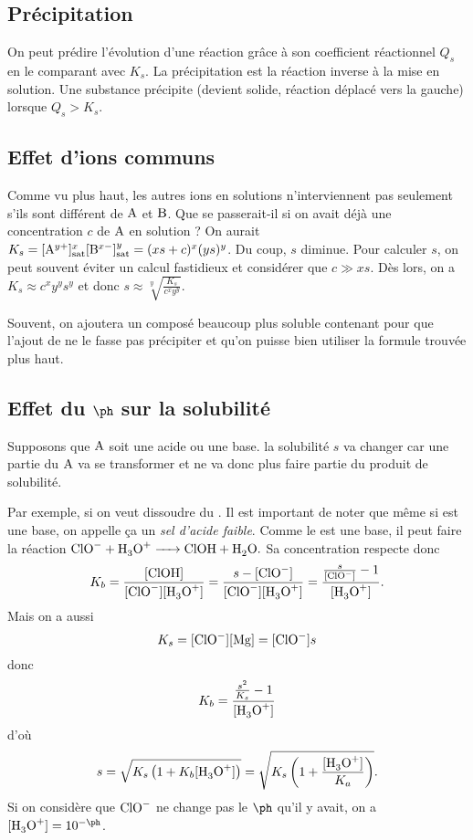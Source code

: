 \subsection{Précipitation}
On peut prédire l'évolution d'une réaction grâce à son coefficient réactionnel
$Q_s$ en le comparant avec $K_s$.
La précipitation est la réaction inverse à la mise en solution.
Une substance précipite (devient solide, réaction déplacé vers la gauche)
lorsque $Q_s > K_s$.

\subsection{Effet d'ions communs}
Comme vu plus haut, les autres ions en solutions n'interviennent pas
seulement s'ils sont différent de $\ce{A}$ et $\ce{B}$.
Que se passerait-il si on avait déjà
une concentration $c$ de $\ce{A}$ en solution ?
On aurait $K_s = [\ce{A}^{y+}]^x_\mathrm{sat}
[\ce{B}^{x-}]^y_\mathrm{sat} = (xs+c)^x(ys)^y$.
Du coup, $s$ diminue.
Pour calculer $s$, on peut souvent éviter un calcul fastidieux
et considérer que $c \gg xs$.
Dès lors, on a
$K_s \approx c^xy^ys^y$ et donc
$s \approx \sqrt[y]{\frac{K_s}{c^xy^y}}$.

Souvent, on ajoutera un composé beaucoup plus soluble contenant
 pour que l'ajout de  ne le fasse pas précipiter
et qu'on puisse bien utiliser la formule trouvée plus haut.

\subsection{Effet du $\ph$ sur la solubilité}
Supposons que $\ce{A}$ soit une acide ou une base.
la solubilité $s$ va changer car une partie du $\ce{A}$ va se transformer
et ne va donc plus faire partie du produit de solubilité.

Par exemple, si on veut dissoudre du .
Il est important de noter que même si  est une base,
on appelle ça un \emph{sel d'acide faible}.
Comme le  est une base,
il peut faire la réaction
\( \ce{ClO- + H3O+ -> ClOH + H2O}. \)
Sa concentration respecte donc
\[ K_b = \frac{[\ce{ClOH}]}{[\ce{ClO-}][\ce{H3O+}]} =
\frac{s-[\ce{ClO-}]}{[\ce{ClO-}][\ce{H3O+}]} =
\frac{\frac{s}{[\ce{ClO-}]}-1}{[\ce{H3O+}]}. \]
Mais on a aussi
\[ K_s = [\ce{ClO-}][\ce{Mg}] = [\ce{ClO-}]s \]
donc
\[ K_b = \frac{\frac{s^2}{K_s}-1}{[\ce{H3O+}]} \]
d'où
\[ s = \sqrt{K_s\left(1+K_b[\ce{H3O+}]\right)} =
\sqrt{K_s\left(1+\frac{[\ce{H3O+}]}{K_a}\right)}. \]
Si on considère que $\ce{ClO-}$ ne change pas le $\ph$ qu'il y avait,
on a $[\ce{H3O+}] = 10^{-\ph}$.

